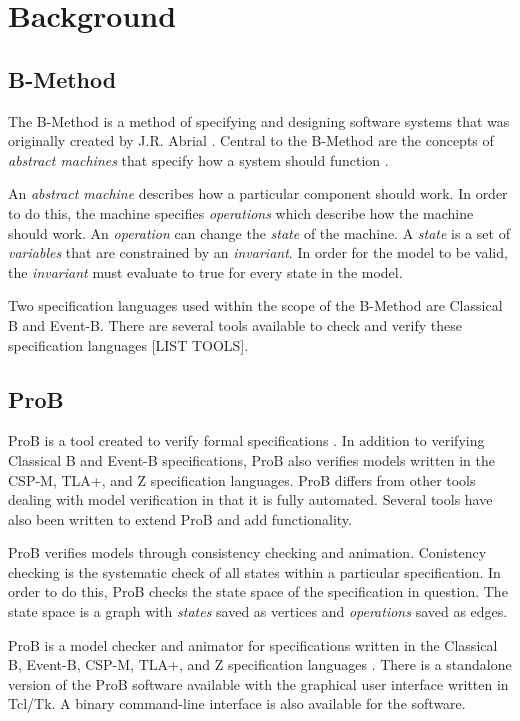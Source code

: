 \section{Background}

\subsection{B-Method}

The B-Method is a method of specifying and designing software systems that was originally created by J.R. Abrial \cite{abrial2005b}. Central to the B-Method are the concepts of \emph{abstract machines} that specify how a system should function \cite{schneider2001b}.

An \emph{abstract machine} describes how a particular component should work. In order to do this, the machine specifies \emph{operations} which describe how the machine should work. An \emph{operation} can change the \emph{state} of the machine. A \emph{state} is a set of \emph{variables} that are constrained by an \emph{invariant}. In order for the model to be valid, the \emph{invariant} must evaluate to true for every state in the model.

Two specification languages used within the scope of the B-Method are Classical B and Event-B. There are several tools available to check and verify these specification languages [LIST TOOLS].

\subsection{ProB}

ProB is a tool created to verify formal specifications \cite{LeBu03_32}. In addition to verifying Classical B and Event-B specifications, ProB also verifies models written in the CSP-M, TLA+, and Z specification languages. ProB differs from other tools dealing with model verification in that it is fully automated. Several tools have also been written to extend ProB and add functionality.

ProB verifies models through consistency checking and animation. Conistency checking is the systematic check of all states within a particular specification. In order to do this, ProB checks the state space of the specification in question. The state space is a graph with \emph{states} saved as vertices and \emph{operations} saved as edges.

ProB is a model checker and animator for specifications written in the Classical B, Event-B, CSP-M, TLA+, and Z specification languages \cite{LeBu03_32}. There is a standalone version of the ProB software available with the graphical user interface written in Tcl/Tk. A binary command-line interface is also available for the software. 

